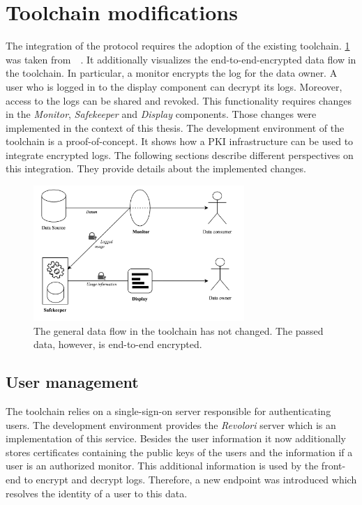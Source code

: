 \documentclass[../main.tex]{subfiles}
\begin{document}
\section{Toolchain modifications}
\label{sec:toolchain-modifications}
The integration of the protocol requires the adoption of the existing toolchain.
\cref{fig:encrypted-toolchain} was taken from~\citeauthor{Zieglmeier2021}~\cite{Zieglmeier2021}.
It additionally visualizes the end-to-end-encrypted data flow in the toolchain.
In particular, a monitor encrypts the log for the data owner.
A user who is logged in to the display component can decrypt its logs.
Moreover, access to the logs can be shared and revoked.
This functionality requires changes in the \emph{Monitor}, \emph{Safekeeper} and \emph{Display} components.
Those changes were implemented in the context of this thesis.
The development environment of the toolchain is a proof-of-concept.
It shows how a PKI infrastructure can be used to integrate encrypted logs.
The following sections describe different perspectives on this integration.
They provide details about the implemented changes.


\begin{figure}[h!]
    \includegraphics[width=8cm]{../img/06/encrypted_toolchain.jpg}
    \centering
    \caption[Toolchain encrypted data flow]{The general data flow in the toolchain has not changed. The passed data, however, is end-to-end encrypted.}
    \label{fig:encrypted-toolchain}
\end{figure}

\subsection{User management}
The toolchain relies on a single-sign-on server responsible for authenticating users.
The development environment provides the \emph{Revolori} server which is an implementation of this service.
Besides the user information it now additionally stores certificates containing the public keys of the users and the information if a user is an authorized monitor.
This additional information is used by the front-end to encrypt and decrypt logs.
Therefore, a new endpoint was introduced which resolves the identity of a user to this data.
\end{document}
